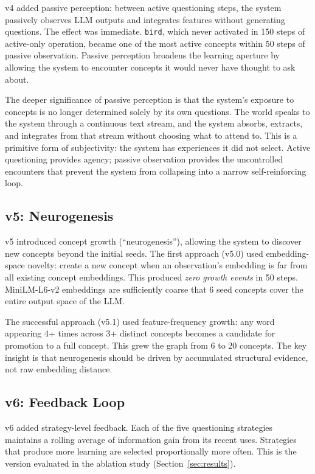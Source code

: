 \documentclass[conference]{IEEEtran}
\begin{document}
v4 added passive perception: between active questioning steps, the system passively observes LLM outputs and integrates features without generating questions. The effect was immediate. \texttt{bird}, which never activated in 150 steps of active-only operation, became one of the most active concepts within 50 steps of passive observation. Passive perception broadens the learning aperture by allowing the system to encounter concepts it would never have thought to ask about.

The deeper significance of passive perception is that the system's exposure to concepts is no longer determined solely by its own questions. The world speaks to the system through a continuous text stream, and the system absorbs, extracts, and integrates from that stream without choosing what to attend to. This is a primitive form of subjectivity: the system has experiences it did not select. Active questioning provides agency; passive observation provides the uncontrolled encounters that prevent the system from collapsing into a narrow self-reinforcing loop.

\subsection{v5: Neurogenesis}

v5 introduced concept growth (``neurogenesis''), allowing the system to discover new concepts beyond the initial seeds. The first approach (v5.0) used embedding-space novelty: create a new concept when an observation's embedding is far from all existing concept embeddings. This produced \emph{zero growth events} in 50 steps. MiniLM-L6-v2 embeddings are sufficiently coarse that 6 seed concepts cover the entire output space of the LLM.

The successful approach (v5.1) used feature-frequency growth: any word appearing 4+ times across 3+ distinct concepts becomes a candidate for promotion to a full concept. This grew the graph from 6 to 20 concepts. The key insight is that neurogenesis should be driven by accumulated structural evidence, not raw embedding distance.

\subsection{v6: Feedback Loop}

v6 added strategy-level feedback. Each of the five questioning strategies maintains a rolling average of information gain from its recent uses. Strategies that produce more learning are selected proportionally more often. This is the version evaluated in the ablation study (Section~\ref{sec:results}).
\end{document}

